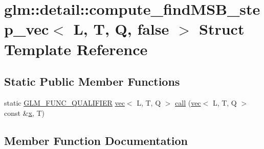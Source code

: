 \hypertarget{structglm_1_1detail_1_1compute__find_m_s_b__step__vec_3_01_l_00_01_t_00_01_q_00_01false_01_4}{}\section{glm\+:\+:detail\+:\+:compute\+\_\+find\+M\+S\+B\+\_\+step\+\_\+vec$<$ L, T, Q, false $>$ Struct Template Reference}
\label{structglm_1_1detail_1_1compute__find_m_s_b__step__vec_3_01_l_00_01_t_00_01_q_00_01false_01_4}
\subsection*{Static Public Member Functions}
\begin{DoxyCompactItemize}
\item 
static \hyperlink{setup_8hpp_a33fdea6f91c5f834105f7415e2a64407}{G\+L\+M\+\_\+\+F\+U\+N\+C\+\_\+\+Q\+U\+A\+L\+I\+F\+I\+ER} \hyperlink{structglm_1_1vec}{vec}$<$ L, T, Q $>$ \hyperlink{structglm_1_1detail_1_1compute__find_m_s_b__step__vec_3_01_l_00_01_t_00_01_q_00_01false_01_4_acbe28b61cee8601996d2ddaca2b9efd3}{call} (\hyperlink{structglm_1_1vec}{vec}$<$ L, T, Q $>$ const \&\hyperlink{_s_d_l__opengl_8h_ad0e63d0edcdbd3d79554076bf309fd47}{x}, T)
\end{DoxyCompactItemize}


\subsection{Member Function Documentation}
\mbox{\label{structglm_1_1detail_1_1compute__find_m_s_b__step__vec_3_01_l_00_01_t_00_01_q_00_01false_01_4_acbe28b61cee8601996d2ddaca2b9efd3}} 
